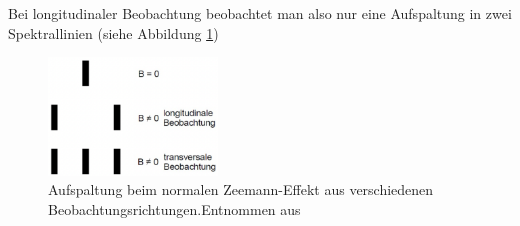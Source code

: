                 Bei longitudinaler Beobachtung beobachtet man also nur eine Aufspaltung in zwei Spektrallinien (siehe Abbildung \ref{fig:Beob})
                \begin{figure}[h]
                    \centering
                    \includegraphics[width = 0.4\textwidth]{pictures/beobachtung.png}
                    \caption{Aufspaltung beim normalen Zeemann-Effekt aus verschiedenen Beobachtungsrichtungen.Entnommen aus \cite{haken_atom-_2004}}
                    \label{fig:Beob}
                \end{figure}

